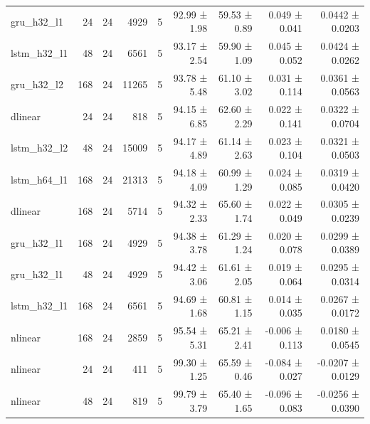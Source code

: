 \begin{table}[htbp]
\begin{tabular}{lrrrrrrrr}
gru\_h32\_l1 & 24 & 24 & 4929 & 5 & 92.99 ± 1.98 & 59.53 ± 0.89 & 0.049 ± 0.041 & 0.0442 ± 0.0203 \\
lstm\_h32\_l1 & 48 & 24 & 6561 & 5 & 93.17 ± 2.54 & 59.90 ± 1.09 & 0.045 ± 0.052 & 0.0424 ± 0.0262 \\
gru\_h32\_l2 & 168 & 24 & 11265 & 5 & 93.78 ± 5.48 & 61.10 ± 3.02 & 0.031 ± 0.114 & 0.0361 ± 0.0563 \\
dlinear & 24 & 24 & 818 & 5 & 94.15 ± 6.85 & 62.60 ± 2.29 & 0.022 ± 0.141 & 0.0322 ± 0.0704 \\
lstm\_h32\_l2 & 48 & 24 & 15009 & 5 & 94.17 ± 4.89 & 61.14 ± 2.63 & 0.023 ± 0.104 & 0.0321 ± 0.0503 \\
lstm\_h64\_l1 & 168 & 24 & 21313 & 5 & 94.18 ± 4.09 & 60.99 ± 1.29 & 0.024 ± 0.085 & 0.0319 ± 0.0420 \\
dlinear & 168 & 24 & 5714 & 5 & 94.32 ± 2.33 & 65.60 ± 1.74 & 0.022 ± 0.049 & 0.0305 ± 0.0239 \\
gru\_h32\_l1 & 168 & 24 & 4929 & 5 & 94.38 ± 3.78 & 61.29 ± 1.24 & 0.020 ± 0.078 & 0.0299 ± 0.0389 \\
gru\_h32\_l1 & 48 & 24 & 4929 & 5 & 94.42 ± 3.06 & 61.61 ± 2.05 & 0.019 ± 0.064 & 0.0295 ± 0.0314 \\
lstm\_h32\_l1 & 168 & 24 & 6561 & 5 & 94.69 ± 1.68 & 60.81 ± 1.15 & 0.014 ± 0.035 & 0.0267 ± 0.0172 \\
nlinear & 168 & 24 & 2859 & 5 & 95.54 ± 5.31 & 65.21 ± 2.41 & -0.006 ± 0.113 & 0.0180 ± 0.0545 \\
nlinear & 24 & 24 & 411 & 5 & 99.30 ± 1.25 & 65.59 ± 0.46 & -0.084 ± 0.027 & -0.0207 ± 0.0129 \\
nlinear & 48 & 24 & 819 & 5 & 99.79 ± 3.79 & 65.40 ± 1.65 & -0.096 ± 0.083 & -0.0256 ± 0.0390 \\
\bottomrule
\end{tabular}
\end{table}
